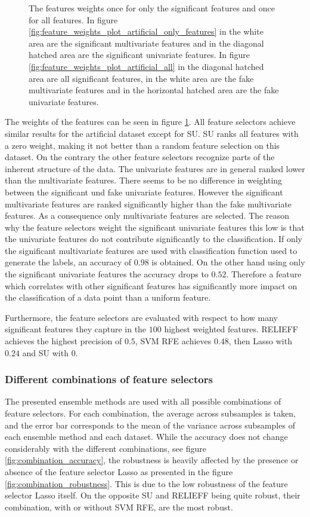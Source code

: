 \documentclass[twoside,11pt]{article}
\begin{document}
\begin{figure}
  \caption{The features weights once for only the significant features and once for all features. In figure \ref{fig:feature_weights_plot_artificial_only_features} in the white area are the significant multivariate features and in the diagonal hatched area are the significant univariate features. In figure \ref{fig:feature_weights_plot_artificial_all} in the diagonal hatched area are all significant features, in the white area are the fake multivariate features and in the horizontal hatched area are the fake univariate features. }
  \label{fig:feature_weights_plot_artificial}
\end{figure}
The weights of the features can be seen in figure \ref{fig:feature_weights_plot_artificial}.
All feature selectors achieve similar results for the artificial dataset except for SU. SU ranks all features with a zero weight, making it not better than a random feature selection on this dataset. On the contrary the other feature selectors recognize parts of the inherent structure of the data. The univariate features are in general ranked lower than the multivariate features. There seems to be no difference in weighting between the significant und fake univariate features. However the significant multivariate features are ranked significantly higher than the fake multivariate features. As a consequence only multivariate features are selected. The reason why the feature selectors weight the significant univariate features this low is that the univariate features do not contribute significantly to the classification. If only the significant multivariate features are used with classification function used to generate the labels, an accuracy of $0.98$ is obtained. On the other hand using only the significant univariate features the accuracy drops to $0.52$. Therefore a feature which correlates with other significant features has significantly more impact on the classification of a data point than a uniform feature.

Furthermore, the feature selectors are evaluated with respect to how many significant features they capture in the $100$ highest weighted features. RELIEFF achieves the highest precision of $0.5$, SVM RFE achieves $0.48$, then Lasso with $0.24$ and SU with $0$.

\subsubsection{Different combinations of feature selectors}
The presented ensemble methods are used with all possible combinations of feature selectors. For each combination, the average across subsamples  is taken, and the error bar corresponds to the mean of the variance across subsamples of each ensemble method and each dataset. While the accuracy does not change considerably with the different combinations, see figure \ref{fig:combination_accuracy}, the robustness is heavily affected by the presence or absence of the feature selector Lasso as presented in the figure \ref{fig:combination_robustness}. This is due to the low robustness of the feature selector Lasso itself. On the opposite SU and RELIEFF being quite robust, their combination, with or without SVM RFE, are the most robust.  
\end{document}
